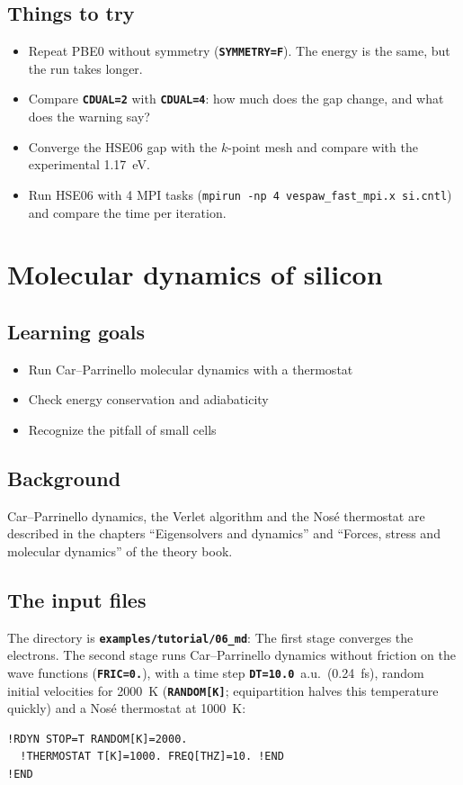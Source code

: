\documentclass[11pt,a4paper,oneside]{book}
\newcommand{\key}[1]{\textbf{\texttt{#1}}}
\newcommand{\file}[1]{\textbf{\texttt{#1}}}
\newcommand{\deck}[1]{{\small}}
\newcommand{\goals}{\section{Learning goals}}
\newcommand{\background}{\section{Background}}
\begin{document}
\section{Things to try}
\begin{itemize}
\item Repeat PBE0 without symmetry (\key{SYMMETRY=F}). The energy is the
  same, but the run takes longer.
\item Compare \key{CDUAL=2} with \key{CDUAL=4}: how much does the gap
  change, and what does the warning say?
\item Converge the HSE06 gap with the $k$-point mesh and compare with the
  experimental 1.17~eV.
\item Run HSE06 with 4 MPI tasks
  (\texttt{mpirun -np 4 vespaw\_fast\_mpi.x si.cntl}) and compare the
  time per iteration.
\end{itemize}

\chapter{Molecular dynamics of silicon}
\minitoc

\goals
\begin{itemize}
\item Run Car--Parrinello molecular dynamics with a thermostat
\item Check energy conservation and adiabaticity
\item Recognize the pitfall of small cells
\end{itemize}

\background
Car--Parrinello dynamics, the Verlet algorithm and the Nos\'e
thermostat are described in the chapters ``Eigensolvers and dynamics''
and ``Forces, stress and molecular dynamics'' of the theory book.

\section{The input files}

The directory is \file{examples/tutorial/06\_md}:
\deck{../../../examples/tutorial/06_md/si8.cntl}
The first stage converges the electrons. The second stage runs
Car--Parrinello dynamics without friction on the wave functions
(\key{FRIC=0.}), with a time step \key{DT=10.0}~a.u.\ (0.24~fs),
random initial velocities for 2000~K (\key{RANDOM[K]}; equipartition
halves this temperature quickly) and a Nos\'e thermostat at 1000~K:
\begin{verbatim}
!RDYN STOP=T RANDOM[K]=2000.
  !THERMOSTAT T[K]=1000. FREQ[THZ]=10. !END
!END
\end{verbatim}
\end{document}
